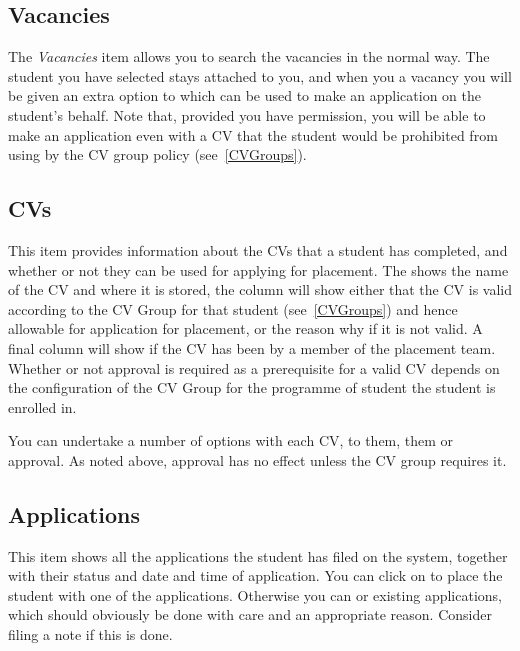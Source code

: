 \documentclass[12 pt]{book}
\begin{document}
\subsection{Vacancies}

The \emph{Vacancies} item allows you to search the vacancies in the normal way.
The student you have selected stays attached to you, and when you
 a vacancy you will be given an extra option to  which can be used to make an application on the student's
behalf. Note that, provided you have permission, you will be able to make an
application even with a CV that the student would be prohibited from using by
the CV group policy (see~\ref{CVGroups}).

\subsection{CVs}

This item provides information about the CVs that a student has completed, and
whether or not they can be used for applying for placement. The 
 shows the name of the CV and where it is stored, the 
 column will show either that the CV is valid according to the
CV Group for that student (see~\ref{CVGroups}) and hence
allowable for application for placement, or the reason why if it is not valid. A
final column will show if the CV has been  by a member of the
placement team. Whether or not approval is required as a prerequisite for a
valid CV depends on the configuration of the CV Group for the programme
of student the student is enrolled in.

You can undertake a number of options with each CV, to  them, 
 them or  approval. As noted above, approval has
no effect unless the CV group requires it.

\subsection{Applications}

This item shows all the applications the student has filed on the system, 
together with their status and date and time of application. You can click on
 to place the student with one of the applications. Otherwise you
can  or  existing applications, which should obviously
be done with care and an appropriate reason. Consider filing a note if this is
done.
\end{document}
